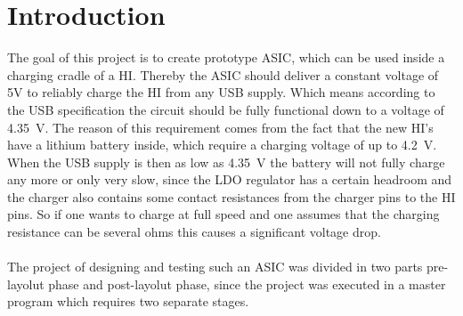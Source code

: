 \section{Introduction}
\label{chap:introduction}
The goal of this project is to create prototype \ac{ASIC}, which can be used inside a charging cradle of a \ac{HI}. Thereby the \ac{ASIC} should deliver a constant voltage of 5V to reliably charge the \ac{HI} from any \ac{USB} supply. Which means according to the \ac{USB} specification the circuit should be fully functional down to a voltage of \qty{4.35}{\volt}. The reason of this requirement comes from the fact that the new \ac{HI}'s have a lithium battery inside, which require a charging voltage of up to \qty{4.2}{\volt}. When the \ac{USB} supply is then as low as \qty{4.35}{\volt} the battery will not fully charge any more or only very slow, since the \ac{LDO} regulator has a certain headroom and the charger also contains some contact resistances from the charger pins to the \ac{HI} pins. So if one wants to charge at full speed and one assumes that the charging resistance can be several ohms this causes a significant voltage drop. \cite{analog_devices_usb_charging} \\\\
The project of designing and testing such an \ac{ASIC} was divided in two parts \glqq pre-layolut phase\grqq{} and \glqq post-layolut phase\grqq{}, since the project was executed in a master program which requires two separate stages.
\clearpage